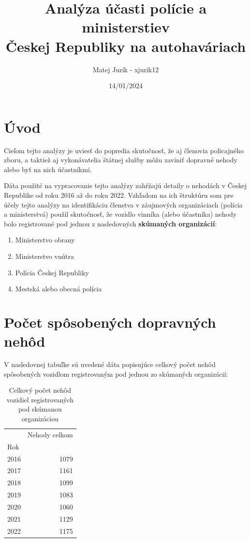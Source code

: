 \documentclass{article}
\title{Analýza účasti polície a ministerstiev \\ Českej Republiky na autohaváriach}
\author{Matej Jurík - xjurik12}
\date{14/01/2024}
\begin{document}
\maketitle

\section{Úvod}\label{sec:uvod}

Cieľom tejto analýzy je uviesť do popredia skutočnosť, že aj členovia policajného zboru, a taktiež
aj vykonávatelia štátnej služby môžu zaviniť dopravné nehody alebo byť na nich účastníkmi.

Dáta použité na vypracovanie tejto analýzy zahŕňajú detaily o nehodách v Českej Republike
od roku 2016 až do roku 2022.
Vzhľadom na ich štruktúru som pre účely tejto analýzy na identifikáciu členstva v záujmových
organizáciach (polícia a ministerstvá)
použil skutočnosť, že vozidlo vinníka (alebo účastníka) nehody bolo registrované pod jednou z nasledovných
\textbf{skúmaných organizácií}:
\begin{enumerate}
 \item Ministerstvo obrany
 \item Ministerstvo vnútra
 \item Polícia Českej Republiky
 \item Mestská alebo obecná polícia
\end{enumerate}



\section{Počet spôsobených dopravných nehôd}\label{sec:pocet-sposobenych-dopravnych-nehod}

V nasledovnej tabuľke sú uvedené dáta popisujúce celkový počet nehôd spôsobených
vozidlom registrovaným pod jednou zo skúmaných organizácií:

\begin{table}[htb]
\caption{Celkový počet nehôd vozidiel registrovaných pod skúmanou organizáciou}
\begin{center}
\begin{tabular}{lr}
\toprule
 & Nehody celkom \\
Rok &  \\
\midrule
2016 & 1079 \\
2017 & 1161 \\
2018 & 1099 \\
2019 & 1083 \\
2020 & 1060 \\
2021 & 1129 \\
2022 & 1175 \\
\bottomrule
\end{tabular}\label{tab:table1}
\end{center}
\end{table}
\end{document}
